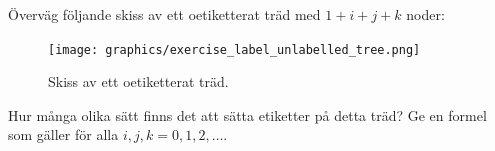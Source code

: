 \documentclass[nobib]{tufte-handout}
\begin{document}
\begin{xca}
    Överväg följande skiss av ett oetiketterat träd med $1 + i + j + k$ noder:
    \begin{figure}
        \centering
        \texttt{[image: graphics/exercise\_label\_unlabelled\_tree.png]}
        \caption{Skiss av ett oetiketterat träd.}
    \end{figure}

    Hur många olika sätt finns det att sätta etiketter på detta träd? Ge en formel som gäller för alla $i, j, k = 0, 1, 2,\ldots$. 

    
\end{xca}
\end{document}
